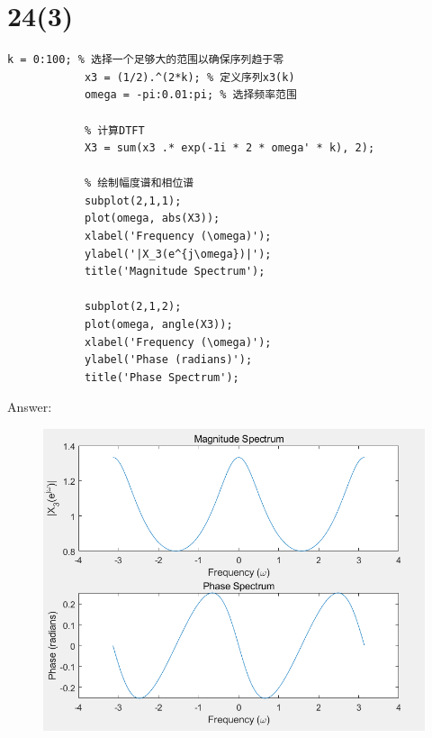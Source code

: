 \documentclass{article}
\begin{document}
    \section*{24(3)}
        \begin{lstlisting}[caption={题24(3) MATLAB代码}, label={lst:matlab}]
            k = 0:100; % 选择一个足够大的范围以确保序列趋于零
            x3 = (1/2).^(2*k); % 定义序列x3(k)
            omega = -pi:0.01:pi; % 选择频率范围

            % 计算DTFT
            X3 = sum(x3 .* exp(-1i * 2 * omega' * k), 2);

            % 绘制幅度谱和相位谱
            subplot(2,1,1);
            plot(omega, abs(X3));
            xlabel('Frequency (\omega)');
            ylabel('|X_3(e^{j\omega})|');
            title('Magnitude Spectrum');

            subplot(2,1,2);
            plot(omega, angle(X3));
            xlabel('Frequency (\omega)');
            ylabel('Phase (radians)');
            title('Phase Spectrum');

        \end{lstlisting}
        Answer:
            \begin{figure}[h]
                \includegraphics{24_3.png}
            \end{figure}
            \FloatBarrier
    
\end{document}

